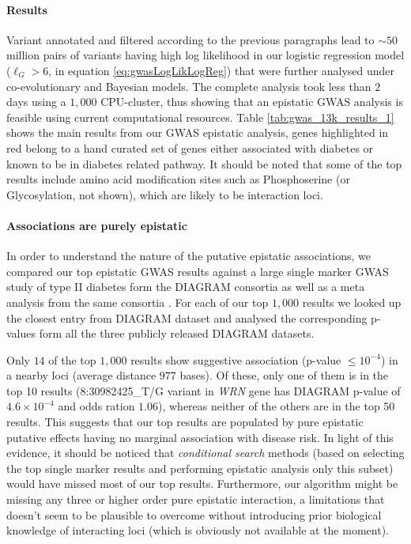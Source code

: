 \paragraph{Results} Variant annotated and filtered according to the previous paragraphs lead to $\sim 50$ million pairs of variants having high log likelihood in our logistic regression model  ($\ell_G > 6$, in equation \ref{eq:gwasLogLikLogReg}) that were further analysed under co-evolutionary and Bayesian models. The complete analysis took less than $2$ days using a $1,000$ CPU-cluster, thus showing that an epistatic GWAS analysis is feasible using current computational resources. Table \ref{tab:gwas_13k_results_1} shows the main results from our GWAS epistatic analysis, genes highlighted in red belong to a hand curated set of genes either associated with diabetes or known to be in diabetes related pathway. It should be noted that some of the top results include amino acid modification sites such as Phosphoserine (or Glycosylation, not shown), which are likely to be interaction loci.

\paragraph{Associations are purely epistatic}
In order to understand the nature of the putative epistatic associations, we compared our top epistatic GWAS results against a large single marker GWAS study of type II diabetes form the DIAGRAM consortia \cite{zeggini2008meta,voight2010twelve} as well as a meta analysis from the same consortia \cite{morris2012large}.
For each of our top $1,000$ results we looked up the closest entry from DIAGRAM dataset and analysed the corresponding p-values form all the three publicly released DIAGRAM datasets.

Only $14$ of the top $1,000$ results show suggestive association (p-value $\le 10^{-4}$) in a nearby loci (average distance $977$ bases).
Of these, only one of them is in the top 10 results (8:30982425\_T/G variant in \textit{WRN} gene has DIAGRAM p-value of $4.6 \times 10^{-4}$ and odds ration $1.06$), whereas neither of the others are in the top 50 results.
This suggests that our top results are populated by pure epistatic putative effects having no marginal association with disease risk.
In light of this evidence, it should be noticed that \textit{conditional search} methods (based on selecting the top single marker results and performing epistatic analysis only this subset) would have missed most of our top results.
Furthermore, our algorithm might be missing any three or higher order pure epistatic interaction, a limitations that doesn't seem to be plausible to overcome without introducing prior biological knowledge of interacting loci (which is obviously not available at the moment).

